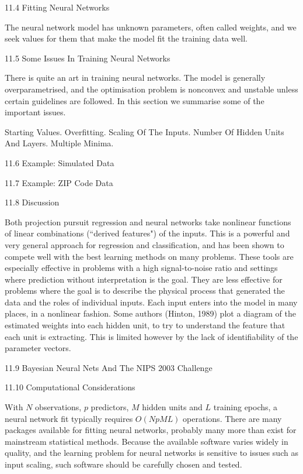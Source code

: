 11.4 Fitting Neural Networks

The neural network model has unknown parameters, often called weights, and we seek values for them that make the model fit the training data well.

11.5 Some Issues In Training Neural Networks

There is quite an art in training neural networks. The model is generally overparametrised, and the optimisation problem is nonconvex and unstable unless certain guidelines are followed. In this section we summarise some of the important issues.

Starting Values. Overfitting. Scaling Of The Inputs. Number Of Hidden Units And Layers. Multiple Minima.

11.6 Example: Simulated Data



11.7 Example: ZIP Code Data



11.8 Discussion

Both projection pursuit regression and neural networks take nonlinear functions of linear combinations (``derived features") of the inputs. This is a powerful and very general approach for regression and classification, and has been shown to compete well with the best learning methods on many problems. These tools are especially effective in problems with a high signal-to-noise ratio and settings where prediction without interpretation is the goal. They are less effective for problems where the goal is to describe the physical process that generated the data and the roles of individual inputs. Each input enters into the model in many places, in a nonlinear fashion. Some authors (Hinton, 1989) plot a diagram of the estimated weights into each hidden unit, to try to understand the feature that each unit is extracting. This is limited however by the lack of identifiability of the parameter vectors.

11.9 Bayesian Neural Nets And The NIPS 2003 Challenge



11.10 Computational Considerations

With $N$ observations, $p$ predictors, $M$ hidden units and $L$ training epochs, a neural network fit typically requires $O(NpML)$ operations. There are many packages available for fitting neural networks, probably many more than exist for mainstream statistical methods. Because the available software varies widely in quality, and the learning problem for neural networks is sensitive to issues such as input scaling, such software should be carefully chosen and tested.

